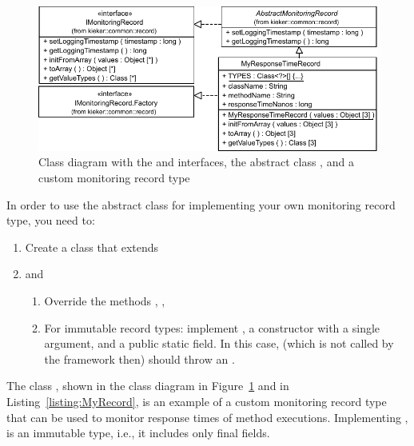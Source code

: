 \begin{figure}[ht]\centering
\includegraphics[scale=0.75]{images/kieker_MyRTRecord-modified}
\caption{Class diagram with the  and  interfaces, the abstract %
class , and a custom monitoring record type %
}
\label{sec:monitoringrecord:interfacesAndImplementingClasses}
\end{figure}


\noindent In order to use the abstract class for implementing your own monitoring record type, you need to:

\begin{enumerate}
\item Create a class that extends 
\item  and
\begin{enumerate}
\item Override the methods , , 
\item For immutable record types: implement , a constructor %
with a single  argument, and a public static  field. %
In this case,  (which is not called by the framework then) should %
throw an .
\end{enumerate}
\end{enumerate}

\noindent The class , shown in the class diagram in %
Figure~\ref{sec:monitoringrecord:interfacesAndImplementingClasses} and in %
Listing~\ref{listing:MyRecord}, is an example of a custom monitoring record type %
that can be used to monitor response times of method executions. %
Implementing ,  is %
an immutable type, i.e., it includes only final fields. %

